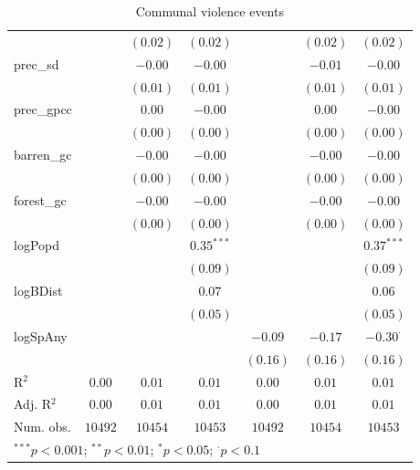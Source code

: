 \begin{sidewaystable}
\begin{center}
{\begin{tabular}{l c c c c c c}
                &                & $(0.02)$     & $(0.02)$     &               & $(0.02)$     & $(0.02)$        \\
prec\_sd        &                & $-0.00$      & $-0.00$      &               & $-0.01$      & $-0.00$         \\
                &                & $(0.01)$     & $(0.01)$     &               & $(0.01)$     & $(0.01)$        \\
prec\_gpcc      &                & $0.00$       & $-0.00$      &               & $0.00$       & $-0.00$         \\
                &                & $(0.00)$     & $(0.00)$     &               & $(0.00)$     & $(0.00)$        \\
barren\_gc      &                & $-0.00$      & $-0.00$      &               & $-0.00$      & $-0.00$         \\
                &                & $(0.00)$     & $(0.00)$     &               & $(0.00)$     & $(0.00)$        \\
forest\_gc      &                & $-0.00$      & $-0.00$      &               & $-0.00$      & $-0.00$         \\
                &                & $(0.00)$     & $(0.00)$     &               & $(0.00)$     & $(0.00)$        \\
logPopd         &                &              & $0.35^{***}$ &               &              & $0.37^{***}$    \\
                &                &              & $(0.09)$     &               &              & $(0.09)$        \\
logBDist        &                &              & $0.07$       &               &              & $0.06$          \\
                &                &              & $(0.05)$     &               &              & $(0.05)$        \\
logSpAny        &                &              &              & $-0.09$       & $-0.17$      & $-0.30^{\cdot}$ \\
                &                &              &              & $(0.16)$      & $(0.16)$     & $(0.16)$        \\
\hline
R$^2$           & $0.00$         & $0.01$       & $0.01$       & $0.00$        & $0.01$       & $0.01$          \\
Adj. R$^2$      & $0.00$         & $0.01$       & $0.01$       & $0.00$        & $0.01$       & $0.01$          \\
Num. obs.       & $10492$        & $10454$      & $10453$      & $10492$       & $10454$      & $10453$         \\
\hline
\multicolumn{7}{l}{\scriptsize{$^{***}p<0.001$; $^{**}p<0.01$; $^{*}p<0.05$; $^{\cdot}p<0.1$}}
\end{tabular}
}
\caption{Communal violence events}
\label{org3}
\end{center}
\end{sidewaystable}
